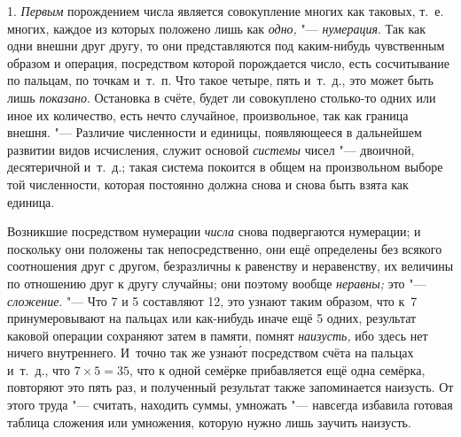 1. {\em Первым} порождением числа является совокупление многих как таковых, т.~е.
многих, каждое из которых положено лишь как {\em одно,} "--- {\em нумерация}.
Так как одни внешни друг другу, то они представляются под каким-нибудь
чувственным образом и операция, посредством которой порождается число, есть
сосчитывание по пальцам, по точкам и~т.~п. Что такое четыре, пять и~т.~д., это
может быть лишь {\em показано}. Остановка в счёте, будет ли совокуплено
столько-то одних или иное их количество, есть нечто случайное, произвольное,
так как граница внешня. "--- Различие численности и единицы, появляющееся в
дальнейшем развитии видов исчисления, служит основой {\em системы} чисел "---
двоичной, десятеричной и~т.~д.; такая система покоится в общем на произвольном
выборе той численности, которая постоянно должна снова и снова быть взята как
единица.

Возникшие посредством нумерации {\em числа} снова подвергаются нумерации; и
поскольку они положены так непосредственно, они ещё определены без всякого
соотношения друг с другом, безразличны к равенству и неравенству, их величины
по отношению друг к другу случайны; они поэтому вообще {\em неравны;} это "---
{\em сложение}. "--- Что 7 и 5 составляют 12, это узнают таким образом, что к~7
принумеровывают на пальцах или как-нибудь иначе ещё 5 одних, результат каковой
операции сохраняют затем в памяти, помнят {\em наизусть,} ибо здесь нет ничего
внутреннего. И~точно так же узна\'{ю}т посредством счёта на пальцах и~т.~д.,
что $7\times 5=35$, что к одной семёрке прибавляется ещё одна семёрка,
повторяют это пять раз, и полученный результат также запоминается наизусть. От
этого труда "--- считать, находить суммы, умножать "--- навсегда избавила
готовая таблица сложения или умножения, которую нужно лишь заучить наизусть.

